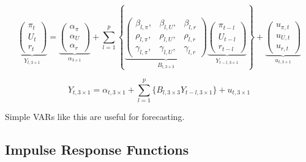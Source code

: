         \begin{equation}
            \underbrace{
            \begin{pmatrix}
                \pi_t\\
                U_t\\
                r_t
            \end{pmatrix}}_{Y_{t,3\times 1}}
            =
            \underbrace{
            \begin{pmatrix}
                \alpha_{\pi}\\
                \alpha_{U}\\
                \alpha_{r}
            \end{pmatrix}}_{\alpha_{3\times 1}}
            +
            \sum_{l=1}^p \left\{
            \underbrace{
            \begin{pmatrix}
                \beta_{l,\pi}, & \beta_{l,U}, & \beta_{l,r}\\
                \rho_{l,\pi}, & \rho_{l,U}, & \rho_{l,r}\\
                \gamma_{l,\pi}, & \gamma_{l,U}, & \gamma_{l,r}
            \end{pmatrix}
            }_{B_{l,3\times 3}}
            \underbrace{
            \begin{pmatrix}
                \pi_{t-l}\\
                U_{t-l}\\
                r_{t-l}
            \end{pmatrix}}_{Y_{t-l,3\times 1}}
            \right\}
            +
            \underbrace{
            \begin{pmatrix}
                u_{\pi,t}\\
                u_{U,t}\\
                u_{r,t}
            \end{pmatrix}}_{u_{t,3\times 1}}
            \label{eqn:VAR}
            \tag{VAR}
        \end{equation}
            
        \begin{equation*}
            Y_{t,3\times 1}=\alpha_{t,3\times 1}+\sum_{l=1}^p \Big\{ B_{l,3\times 3} Y_{t-l,3\times 1} \Big\} + u_{t,3\times 1}
        \end{equation*}

        Simple VARs like this are useful for forecasting.

    \subsection{Impulse Response Functions}

